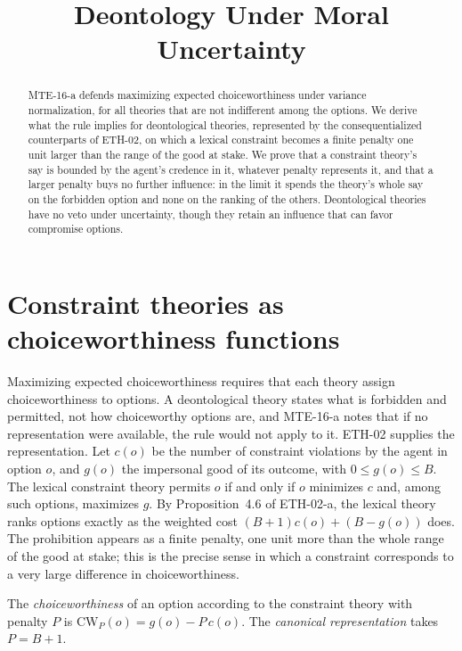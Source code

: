 \documentclass{situationist-preprint}
\title{Deontology Under Moral Uncertainty}
\begin{document}
\maketitle

\begin{abstract}
MTE-16-a defends maximizing expected choiceworthiness under variance normalization, for all theories that are not indifferent among the options. We derive what the rule implies for deontological theories, represented by the consequentialized counterparts of ETH-02, on which a lexical constraint becomes a finite penalty one unit larger than the range of the good at stake. We prove that a constraint theory's say is bounded by the agent's credence in it, whatever penalty represents it, and that a larger penalty buys no further influence: in the limit it spends the theory's whole say on the forbidden option and none on the ranking of the others. Deontological theories have no veto under uncertainty, though they retain an influence that can favor compromise options.
\end{abstract}

\section{Constraint theories as choiceworthiness functions}

Maximizing expected choiceworthiness requires that each theory assign choiceworthiness to options. A deontological theory states what is forbidden and permitted, not how choiceworthy options are, and MTE-16-a notes that if no representation were available, the rule would not apply to it. ETH-02 supplies the representation. Let $c(o)$ be the number of constraint violations by the agent in option $o$, and $g(o)$ the impersonal good of its outcome, with $0\le g(o)\le B$. The lexical constraint theory permits $o$ if and only if $o$ minimizes $c$ and, among such options, maximizes $g$. By Proposition~4.6 of ETH-02-a, the lexical theory ranks options exactly as the weighted cost $(B+1)c(o)+(B-g(o))$ does. The prohibition appears as a finite penalty, one unit more than the whole range of the good at stake; this is the precise sense in which a constraint corresponds to a very large difference in choiceworthiness.

\begin{definition}\label{d:cw}
The \emph{choiceworthiness} of an option according to the constraint theory with penalty $P$ is $\mathrm{CW}_P(o) = g(o) - P\,c(o)$. The \emph{canonical representation} takes $P = B+1$.
\end{definition}
\end{document}
